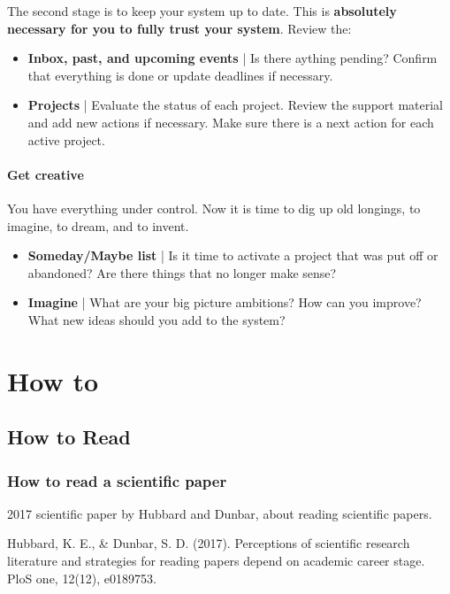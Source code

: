 The second stage is to keep your system up to date. This is \textbf{absolutely necessary for you to fully trust your system}. Review the:
\begin{itemize}
\item
	\textbf{Inbox, past, and upcoming events} | Is there aything pending? Confirm that everything is done or update deadlines if necessary.
\item
	\textbf{Projects} | Evaluate the status of each project. Review the support material and add new actions if necessary. Make sure there is a next action for each active project.
\end{itemize}

\subsubsection*{Get creative}
You have everything under control. Now it is time to dig up old longings, to imagine, to dream, and to invent.
\begin{itemize}
\item \textbf{Someday/Maybe list} | Is it time to activate a project that was put off or abandoned? Are there things that no longer make sense?

\item \textbf{Imagine} | What are your big picture ambitions? How can you improve? What new ideas should you add to the system?

\end{itemize}



\chapter{How to}

\section{How to Read}

\subsection{How to read a scientific paper}
 2017 scientific paper by Hubbard and Dunbar, about reading scientific papers.

 Hubbard, K. E., \& Dunbar, S. D. (2017). Perceptions of scientific research literature and strategies for reading papers depend on academic career stage. PloS one, 12(12), e0189753.


